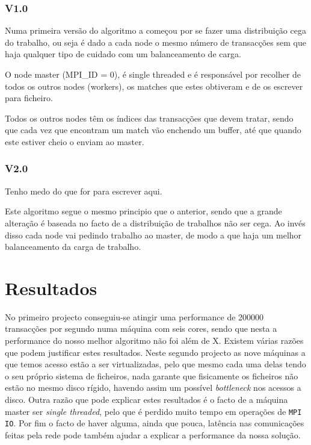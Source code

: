 \documentclass[a4paper]{article}
\begin{document}
\subsubsection{V1.0}
\indent \indent Numa primeira versão do algoritmo a começou por se fazer uma distribuição cega do trabalho, ou seja é dado a cada node o mesmo número de transacções sem que haja qualquer tipo de cuidado com um balanceamento de carga.

O node master (MPI\_ID = 0), é single threaded e é responsável por recolher de todos os outros nodes (workers), os matches que estes obtiveram e de os escrever para ficheiro.

Todos os outros nodes têm os índices das transacções que devem tratar, sendo que cada vez que encontram um match vão enchendo um buffer, até que quando este estiver cheio o enviam ao master. 
\subsubsection{V2.0}
\indent \indent Tenho medo do que for para escrever aqui.

Este algoritmo segue o mesmo principio que o anterior, sendo que a grande alteração é baseada no facto de a distribuição de trabalhos não ser cega. Ao invés disso cada node vai pedindo trabalho ao master, de modo a que haja um melhor balanceamento da carga de trabalho.
\clearpage


\section{Resultados}
\indent \indent No primeiro projecto conseguiu-se atingir uma performance de 200000 transacções por segundo numa máquina com seis cores, sendo que nesta a performance do nosso melhor algoritmo não foi além de X. Existem várias razões que podem justificar estes resultados. Neste segundo projecto as nove máquinas a que temos acesso estão a ser virtualizadas, pelo que mesmo cada uma delas tendo o seu próprio sistema de ficheiros, nada garante que fisicamente os ficheiros não estão no mesmo disco rígido, havendo assim um possível \textit{bottleneck} nos acessos a disco. Outra razão que pode explicar estes resultados é o facto de a máquina master ser \textit{single threaded}, pelo que é perdido muito tempo em operações de \texttt{MPI IO}. Por fim o facto de haver alguma, ainda que pouca, latência nas comunicações feitas pela rede pode também ajudar a explicar a performance da nossa solução.
\end{document}
